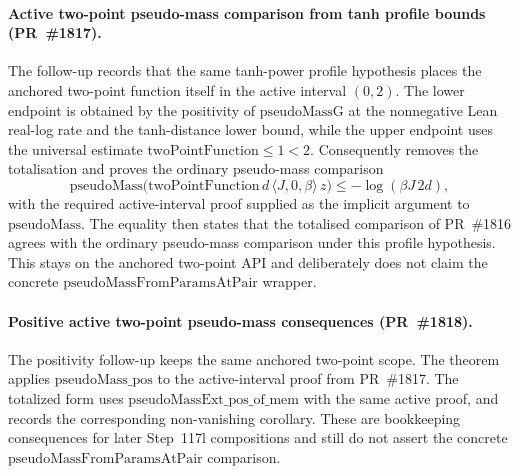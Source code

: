 \documentclass[a4paper,11pt]{article}
\begin{document}
\paragraph{Active two-point pseudo-mass comparison from tanh profile bounds
(PR~\#1817).}
The follow-up
records that the same tanh-power profile hypothesis places the anchored
two-point function itself in the active interval $(0,2)$.  The lower endpoint
is obtained by the positivity of $\mathrm{pseudoMassG}$ at the nonnegative
Lean real-log rate and the tanh-distance lower bound, while the upper endpoint
uses the universal estimate
\(\mathrm{twoPointFunction}\le 1 < 2\).
Consequently
removes the totalisation and proves the ordinary pseudo-mass comparison
\[
  \mathrm{pseudoMass}\bigl(
    \mathrm{twoPointFunction}\,d\,\langle J,0,\beta\rangle\,z\bigr)
    \le -\log(\beta J\,2d),
\]
with the required active-interval proof supplied as the implicit argument to
\(\mathrm{pseudoMass}\).  The equality
then states that the totalised comparison of PR~\#1816 agrees with the ordinary
pseudo-mass comparison under this profile hypothesis.  This stays on the
anchored two-point API and deliberately does not claim the concrete
\(\mathrm{pseudoMassFromParamsAtPair}\) wrapper.

\paragraph{Positive active two-point pseudo-mass consequences (PR~\#1818).}
The positivity follow-up keeps the same anchored two-point scope.  The theorem
applies \(\mathrm{pseudoMass\_pos}\) to the active-interval proof from
PR~\#1817.  The totalized form
uses \(\mathrm{pseudoMassExt\_pos\_of\_mem}\) with the same active proof, and
records the corresponding non-vanishing corollary.  These are bookkeeping
consequences for later Step~117l compositions and still do not assert the
concrete \(\mathrm{pseudoMassFromParamsAtPair}\) comparison.
\end{document}
